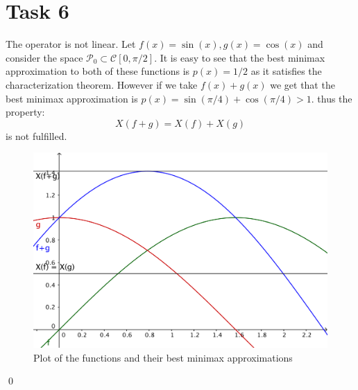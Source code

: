 \documentclass[a4paper, 11pt]{article}
\begin{document}
\section*{Task 6}
The operator is not linear. Let $f(x) = \sin (x), g(x) = \cos (x)$ and consider the space $\mathcal{P}_0 \subset \mathcal{C}[0, \pi/2]$. It is easy to see that the best minimax approximation to both of these functions is $p(x) = 1/2$ as it satisfies the characterization theorem. However if we take $f(x)+g(x)$ we get that the best minimax approximation is $p(x) = \sin(\pi/4)+\cos(\pi/4)>1$. thus the property:
\begin{equation*}
X(f+g) = X(f) + X(g)
\end{equation*}
is not fulfilled.
\begin{figure}[h]
\centering 
\includegraphics[scale = 0.5]{figtask6.png}
\caption{Plot of the functions and their best minimax approximations}
\label{figtask6}
\end{figure}
\qed
\end{document}
